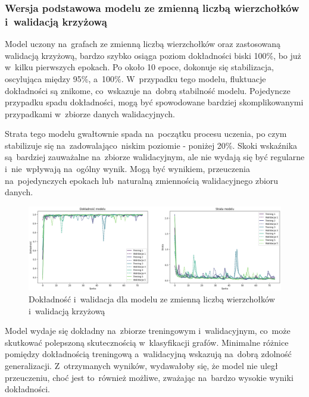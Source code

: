 \subsubsection{Wersja podstawowa modelu ze zmienną liczbą wierzchołków i~walidacją krzyżową}

Model uczony na~grafach ze zmienną liczbą wierzchołków oraz zastosowaną walidacją krzyżową,
bardzo szybko osiąga poziom dokładności biski 100\%, bo już w~kilku pierwszych epokach.
Po około 10 epoce, dokonuje się stabilizacja, oscylująca między 95\%, a~100\%.
W~przypadku tego modelu, fluktuacje dokładności są znikome, co~wskazuje na~dobrą stabilność modelu.
Pojedyncze przypadku spadu dokładności, mogą być spowodowane bardziej skomplikowanymi
przypadkami w~zbiorze danych walidacyjnych.

Strata tego modelu gwałtownie spada na~początku procesu uczenia,
po czym stabilizuje się na~zadowalająco~niskim poziomie - poniżej 20\%.
Skoki wskaźnika są~bardziej zauważalne na~zbiorze walidacyjnym,
ale nie wydają się być regularne i~nie~wpływają na~ogólny wynik.
Mogą być wynikiem, przeuczenia na~pojedynczych epokach lub~naturalną zmiennością walidacyjnego zbioru danych.

\begin{figure}[ht]
	\centering
	\includegraphics[width=15.5cm]{resources/tests/images/v3/multiple_edges_crossvalid_img.png}
	\caption{Dokładność i~walidacja dla modelu ze zmienną liczbą wierzchołków \\ i~walidacją krzyżową}
	\label{Fig:tests-csvar-0a}
\end{figure}
\FloatBarrier

Model wydaje się dokładny na~zbiorze treningowym i~walidacyjnym,
co~może skutkować polepszoną skutecznością w~klasyfikacji grafów.
Minimalne różnice pomiędzy dokładnością treningową a~walidacyjną wskazują na~dobrą zdolność generalizacji.
Z~otrzymanych wyników, wydawałoby się, że model nie uległ przeuczeniu,
choć jest to~również możliwe, zważając na~bardzo wysokie wyniki dokładności. 

